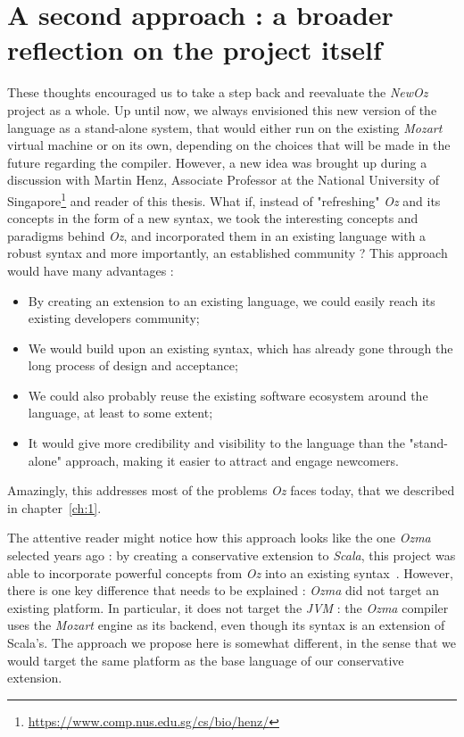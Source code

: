 \section{A second approach : a broader reflection on the project itself}\label{sec:ch4-reflection}
These thoughts encouraged us to take a step back and reevaluate the \textit{NewOz} project as a whole.
Up until now, we always envisioned this new version of the language as a stand-alone system, that would either run on the existing \textit{Mozart} virtual machine or on its own, depending on the choices that will be made in the future regarding the compiler.
However, a new idea was brought up during a discussion with Martin Henz, Associate Professor at the National University of Singapore\footnote{\url{https://www.comp.nus.edu.sg/cs/bio/henz/}} and reader of this thesis.
What if, instead of "refreshing" \textit{Oz} and its concepts in the form of a new syntax, we took the interesting concepts and paradigms behind \textit{Oz}, and incorporated them in an existing language with a robust syntax and more importantly, an established community ?
This approach would have many advantages :
\begin{itemize}
    \item By creating an extension to an existing language, we could easily reach its existing developers community;
    \item We would build upon an existing syntax, which has already gone through the long process of design and acceptance;
    \item We could also probably reuse the existing software ecosystem around the language, at least to some extent;
    \item It would give more credibility and visibility to the language than the "stand-alone" approach, making it easier to attract and engage newcomers.
\end{itemize}
Amazingly, this addresses most of the problems \textit{Oz} faces today, that we described in chapter~\ref{ch:1}.\newline

The attentive reader might notice how this approach looks like the one \textit{Ozma} selected years ago : by creating a conservative extension to \textit{Scala}, this project was able to incorporate powerful concepts from \textit{Oz} into an existing syntax~\cite{Ozma}.
However, there is one key difference that needs to be explained : \textit{Ozma} did not target an existing platform.
In particular, it does not target the \textit{JVM} : the \textit{Ozma} compiler uses the \textit{Mozart} engine as its backend, even though its syntax is an extension of Scala's.
The approach we propose here is somewhat different, in the sense that we would target the same platform as the base language of our conservative extension.\newline

